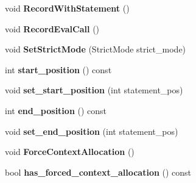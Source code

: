 \begin{DoxyCompactItemize}
\item 
\hypertarget{classv8_1_1internal_1_1_scope_ad4f0987d18c1f95e0a3cfc886a99203b}{}void {\bfseries Record\+With\+Statement} ()\label{classv8_1_1internal_1_1_scope_ad4f0987d18c1f95e0a3cfc886a99203b}

\item 
\hypertarget{classv8_1_1internal_1_1_scope_abb725bce049d5b79020961a7d01154d7}{}void {\bfseries Record\+Eval\+Call} ()\label{classv8_1_1internal_1_1_scope_abb725bce049d5b79020961a7d01154d7}

\item 
\hypertarget{classv8_1_1internal_1_1_scope_a01fa7748c39902cb397be07e1c568445}{}void {\bfseries Set\+Strict\+Mode} (Strict\+Mode strict\+\_\+mode)\label{classv8_1_1internal_1_1_scope_a01fa7748c39902cb397be07e1c568445}

\item 
\hypertarget{classv8_1_1internal_1_1_scope_af78d3db495c9278ab8539571eefc7a96}{}int {\bfseries start\+\_\+position} () const \label{classv8_1_1internal_1_1_scope_af78d3db495c9278ab8539571eefc7a96}

\item 
\hypertarget{classv8_1_1internal_1_1_scope_ab8b18eaeaf400ee1798af3a45fb4cd50}{}void {\bfseries set\+\_\+start\+\_\+position} (int statement\+\_\+pos)\label{classv8_1_1internal_1_1_scope_ab8b18eaeaf400ee1798af3a45fb4cd50}

\item 
\hypertarget{classv8_1_1internal_1_1_scope_aad5f40c0ebef98d84cd51cb31cf6eb53}{}int {\bfseries end\+\_\+position} () const \label{classv8_1_1internal_1_1_scope_aad5f40c0ebef98d84cd51cb31cf6eb53}

\item 
\hypertarget{classv8_1_1internal_1_1_scope_a11abdf08eaa1d0a868efa18e28468820}{}void {\bfseries set\+\_\+end\+\_\+position} (int statement\+\_\+pos)\label{classv8_1_1internal_1_1_scope_a11abdf08eaa1d0a868efa18e28468820}

\item 
\hypertarget{classv8_1_1internal_1_1_scope_a08eab8b737d072b027ea0edb3f5e5134}{}void {\bfseries Force\+Context\+Allocation} ()\label{classv8_1_1internal_1_1_scope_a08eab8b737d072b027ea0edb3f5e5134}

\item 
\hypertarget{classv8_1_1internal_1_1_scope_a8379e548a3dcc952762822ba740c2be5}{}bool {\bfseries has\+\_\+forced\+\_\+context\+\_\+allocation} () const \label{classv8_1_1internal_1_1_scope_a8379e548a3dcc952762822ba740c2be5}


\end{DoxyCompactItemize}
